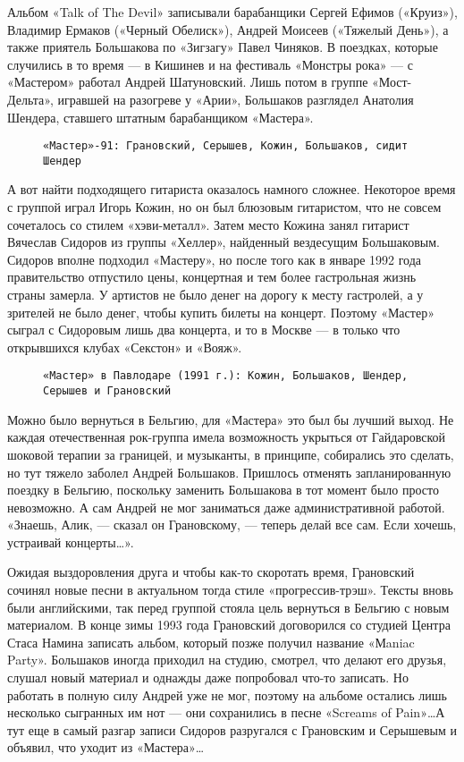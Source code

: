 Альбом «Talk of The Devil» записывали барабанщики Сергей Ефимов («Круиз»), Владимир Ермаков («Черный Обелиск»), Андрей
Моисеев («Тяжелый День»), а также приятель Большакова по «Зигзагу» Павел Чиняков. В поездках, которые случились в то
время — в Кишинев и на фестиваль «Монстры рока» — с «Мастером» работал Андрей Шатуновский. Лишь потом в группе
«Мост-Дельта», игравшей на разогреве у «Арии», Большаков разглядел Анатолия Шендера, ставшего штатным барабанщиком
«Мастера».

\begin{figure}[h]
    \centering
    \caption{\texttt{«Мастер»-91: Грановский, Серышев, Кожин, Большаков, сидит Шендер}}
\end{figure}

А вот найти подходящего гитариста оказалось намного сложнее. Некоторое время с группой играл Игорь Кожин, но он был
блюзовым гитаристом, что не совсем сочеталось со стилем «хэви-металл». Затем место Кожина занял гитарист Вячеслав
Сидоров из группы «Хеллер», найденный вездесущим Большаковым. Сидоров вполне подходил «Мастеру», но после того как в
январе 1992 года правительство отпустило цены, концертная и тем более гастрольная жизнь страны замерла. У артистов не
было денег на дорогу к месту гастролей, а у зрителей не было денег, чтобы купить билеты на концерт. Поэтому «Мастер»
сыграл с Сидоровым лишь два концерта, и то в Москве — в только что открывшихся клубах «Секстон» и «Вояж».

\begin{figure}[h]
    \centering
    \caption{\texttt{«Мастер» в Павлодаре (1991 г.): Кожин, Большаков, Шендер, Серышев и Грановский}}
\end{figure}

Можно было вернуться в Бельгию, для «Мастера» это был бы лучший выход. Не каждая отечественная рок-группа имела
возможность укрыться от Гайдаровской шоковой терапии за границей, и музыканты, в принципе, собирались это сделать, но
тут тяжело заболел Андрей Большаков. Пришлось отменять запланированную поездку в Бельгию, поскольку заменить Большакова
в тот момент было просто невозможно. А сам Андрей не мог заниматься даже административной работой. «Знаешь, Алик, —
сказал он Грановскому, — теперь делай все сам. Если хочешь, устраивай концерты\ldots».

Ожидая выздоровления друга и чтобы как-то скоротать время, Грановский сочинял новые песни в актуальном тогда стиле
«прогрессив-трэш». Тексты вновь были английскими, так перед группой стояла цель вернуться в Бельгию с новым материалом.
В конце зимы 1993 года Грановский договорился со студией Центра Стаса Намина записать альбом, который позже получил
название «Мaniac Party». Большаков иногда приходил на студию, смотрел, что делают его друзья, слушал новый материал и
однажды даже попробовал что-то записать. Но работать в полную силу Андрей уже не мог, поэтому на альбоме остались лишь
несколько сыгранных им нот — они сохранились в песне «Screams of Pain»\ldots А тут еще в самый разгар записи Сидоров
разругался с Грановским и Серышевым и объявил, что уходит из «Мастера»\ldots

